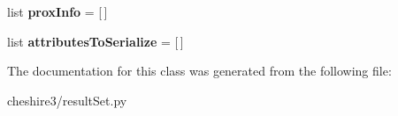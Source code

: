 \begin{DoxyCompactItemize}
\item 
\hypertarget{classcheshire3_1_1result_set_1_1_simple_result_set_item_a2a4812fb7a8489b57548873e376414d9}{list {\bfseries prox\-Info} = \mbox{[}$\,$\mbox{]}}\label{classcheshire3_1_1result_set_1_1_simple_result_set_item_a2a4812fb7a8489b57548873e376414d9}

\item 
\hypertarget{classcheshire3_1_1result_set_1_1_simple_result_set_item_a838d1a7dd163853bace1d0e555e8755c}{list {\bfseries attributes\-To\-Serialize} = \mbox{[}$\,$\mbox{]}}\label{classcheshire3_1_1result_set_1_1_simple_result_set_item_a838d1a7dd163853bace1d0e555e8755c}

\end{DoxyCompactItemize}


The documentation for this class was generated from the following file\-:\begin{DoxyCompactItemize}
\item 
cheshire3/result\-Set.\-py\end{DoxyCompactItemize}
